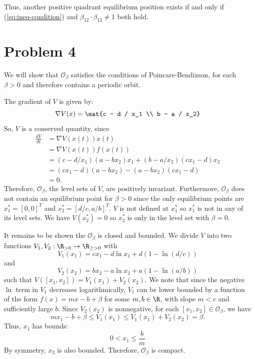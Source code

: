 \documentclass{homework}
\begin{document}
Thus, another positive quadrant equilibrium position exists if and only if
(\ref{eq:ineq-condition}) and $\beta_{12} \cdot \beta_{12} \neq 1$ both hold.


\section{Problem 4}
We will show that $\mathcal{O}_\beta$ satisfies the conditions of Poincare-Bendixson,
for each $\beta >0$ and therefore contains a periodic orbit.

The gradient of $V$ is given by:
\begin{equation*}
    \nabla V(x) = \mat{c - d / x_1 \\ b - a / x_2}
\end{equation*}
So, $V$ is a conserved quantity, since
\begin{align*}
    \frac{dV}{dt} &= \nabla V(x(t)) \dot{x}(t) \\
        &= \nabla V(x(t)) f(x(t)) \\
        &= (c - d/x_1)(a - bx_2)x_1 + (b - a/x_2)(cx_1 - d)x_2 \\
        &= (cx_1 - d) (a - bx_2) - (a - bx_2) (cx_1 - d) \\
        &= 0.
\end{align*}
Therefore, $\mathcal{O}_\beta$, the level sets of $V$, are positively invariant.
Furthermore, $\mathcal{O}_\beta$ does not contain an equilibrium point for $\beta>0$
since
the only equilibrium points are $x_1^* = [0, 0]^T$ and $x_2^* = [d/c, a/b]^T$.
$V$ is not defined at $x_1^*$ so $x_1^*$ is not in any of its level sets. We
have $V(x_2^*) = 0$ so $x_2^*$ is only in the level set with $\beta=0$.

It remains to be shown the $\mathcal{O}_\beta$ is closed and bounded.
We divide $V$ into two functions $V_1,V_2: \R_{>0} \to \R_{\geq>0}$ with
\begin{equation*}
    V_1(x_1) = cx_1 - d\ln x_1 + d(1 - \ln(d/c))
\end{equation*}
and
\begin{equation*}
    V_2(x_2) = bx_2 - a\ln x_2 + a(1 - \ln(a/b))
\end{equation*}
such that $V([x_1, x_2]) = V_1(x_1) + V_2(x_2)$. We note that since the negative
$\ln$ term in $V_1$ decreases logarithmically, $V_1$ can be lower bounded by
a function of the form $f(x) = mx - b + \beta$ for some $m,b\in\R$, with slope
$m<c$ and sufficiently large $b$.  Since $V_2(x_2)$ is nonnegative, for each
$[x_1, x_2] \in\mathcal{O}_\beta$, we have
\begin{equation*}
    m x_1 - b + \beta \leq V_1(x_1) \leq V_1(x_1) + V_2(x_2) = \beta.
\end{equation*}
Thus, $x_1$ has bounds:
\begin{equation*}
    0 < x_1 \leq \frac{b}{m}
\end{equation*}
By symmetry, $x_2$ is also bounded. Therefore, $\mathcal{O}_\beta$ is compact.
\end{document}
